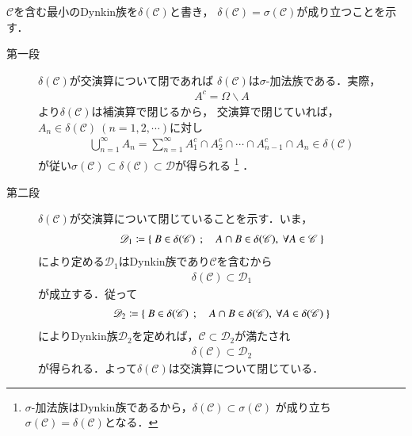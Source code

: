 \begin{prf}$\mathscr{C}$を含む最小のDynkin族を$\delta(\mathscr{C})$と書き，
	$\delta(\mathscr{C}) = \sigma(\mathscr{C})$が成り立つことを示す．
	\begin{description}
		\item[第一段]
			$\delta(\mathscr{C})$が交演算について閉であれば
			$\delta(\mathscr{C})$は$\sigma$-加法族である．実際，
			\begin{align}
				A^c = \Omega \backslash A
			\end{align}
			より$\delta(\mathscr{C})$は補演算で閉じるから，
			交演算で閉じていれば，
			$A_n \in \delta(\mathscr{C})\ (n=1,2,\cdots)$に対し
			\begin{align}
				\bigcup_{n=1}^{\infty} A_n
				= \sum_{n=1}^{\infty} A_1^c \cap A_2^c \cap \cdots \cap A_{n-1}^c \cap A_n
				\in \delta(\mathscr{C})
			\end{align}
			が従い$\sigma(\mathscr{C}) \subset \delta(\mathscr{C}) \subset \mathscr{D}$が得られる
			\footnote{
				$\sigma$-加法族はDynkin族であるから，$\delta(\mathscr{C}) \subset \sigma(\mathscr{C})$
				が成り立ち$\sigma(\mathscr{C}) = \delta(\mathscr{C})$となる．
			}
			．
			
		\item[第二段]
			$\delta(\mathscr{C})$が交演算について閉じていることを示す．いま，
			\begin{align}
				\mathscr{D}_1 \coloneqq
				\Set{B \in \delta(\mathscr{C})}{ A \cap B \in \delta(\mathscr{C}),\ 
				\forall A \in \mathscr{C}}
			\end{align}
			により定める$\mathscr{D}_1$はDynkin族であり$\mathscr{C}$を含むから
			\begin{align}
				\delta(\mathscr{C}) \subset \mathscr{D}_1
			\end{align}
			が成立する．従って
			\begin{align}
				\mathscr{D}_2 \coloneqq
				\Set{B \in \delta(\mathscr{C})}{ A \cap B \in \delta(\mathscr{C}),\ 
				\forall A \in \delta(\mathscr{C})}
			\end{align}
			によりDynkin族$\mathscr{D}_2$を定めれば，$\mathscr{C} \subset \mathscr{D}_2$が満たされ
			\begin{align}
				\delta(\mathscr{C}) \subset \mathscr{D}_2
			\end{align}
			が得られる．よって$\delta(\mathscr{C})$は交演算について閉じている．
			\QED
	\end{description}
\end{prf}

